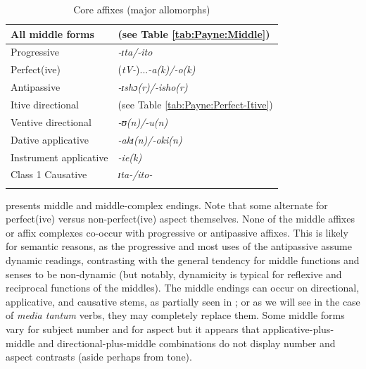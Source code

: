 \documentclass[output=paper,colorlinks,citecolor=brown
]{langscibook}
\begin{document}
\begin{table}
\caption{Core affixes (major allomorphs)}
\label{tab:Payne:Core}
\begin{tabular}{ll}
\lsptoprule
All middle forms & (see Table \ref{tab:Payne:Middle})\\ 
\midrule
Progressive & \textit{-ɪta/-ito}\\
Perfect(ive) & (\textit{tV-})...\textit{-a(k)/-o(k)}\\
Antipassive & \textit{-ɪshɔ(r)/-isho(r)}\\
Itive directional & (see Table \ref{tab:Payne:Perfect-Itive})\\
Ventive directional & \textit{-ʊ(n)/-u(n)}\\
Dative applicative & \textit{-akɪ(n)/-oki(n)}\\
Instrument applicative & \textit{-ie(k)}\\
Class 1 Causative & \textit{ɪta-/ito-}\\
\lspbottomrule
\end{tabular}
\end{table}


 presents middle and middle-complex endings. Note that some alternate for perfect(ive) versus non-perfect(ive) aspect themselves. None of the middle affixes or affix complexes co-occur with progressive or antipassive affixes. This is likely for semantic reasons, as the progressive and most uses of the antipassive assume dynamic readings, contrasting with the general tendency for middle functions and senses to be non-dynamic (but notably, dynamicity is typical for reflexive and reciprocal functions of the middles). The middle endings can occur on directional, applicative, and causative stems, as partially seen in ; or as we will see in the case of \textit{media tantum} verbs, they may completely replace them. Some middle forms vary for subject number and for aspect but it appears that applicative-plus-middle and directional-plus-middle combinations do not display number and aspect contrasts (aside perhaps from tone). 
\end{document}

